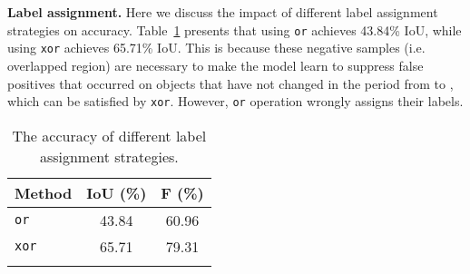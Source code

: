 \documentclass[10pt,twocolumn,letterpaper]{article}
\begin{document}
\noindent\textbf{Label assignment.}
Here we discuss the impact of different label assignment strategies on accuracy. 
Table~\ref{tab:label_assign} presents that using \texttt{or} achieves 43.84\% IoU, while using \texttt{xor} achieves 65.71\% IoU. 
This is because these negative samples (i.e. overlapped region) are necessary to make the model learn to suppress false positives that occurred on objects that have not changed in the period from  to , which can be satisfied by \texttt{xor}.
However, \texttt{or} operation wrongly assigns their labels.

\vspace{-2mm}

\begin{table}[htb]
    \caption{The accuracy of different label assignment strategies.
        \label{tab:label_assign}}
    \centering
    \renewcommand{\arraystretch}{1.2}
    \begin{tabular}{l|cc}
        \shline
        Method       & IoU (\%) & F (\%) \\ \hline
        \texttt{or}  & 43.84    & 60.96      \\
        \texttt{xor} & 65.71    & 79.31      \\
        \shline
    \end{tabular}
    \vspace{-2mm}
\end{table}
\end{document}
